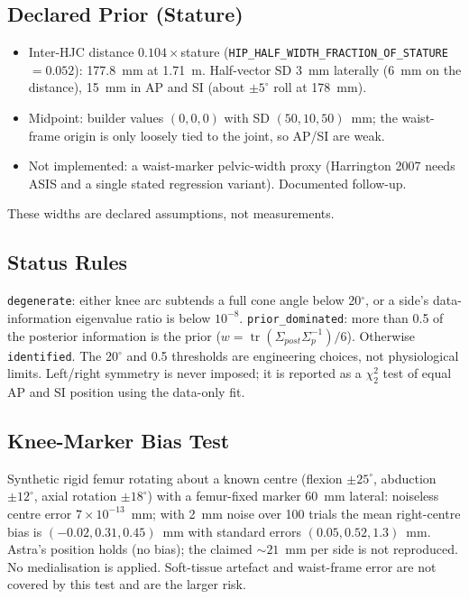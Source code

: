 \subsection{Declared Prior (Stature)}
\begin{itemize}
  \item Inter-HJC distance $0.104\times$stature (\texttt{HIP\_HALF\_WIDTH\_FRACTION\_OF\_STATURE}
  $=0.052$): 177.8~mm at 1.71~m. Half-vector SD 3~mm laterally (6~mm on the distance),
  15~mm in AP and SI (about $\pm5^\circ$ roll at 178~mm).
  \item Midpoint: builder values $(0,0,0)$ with SD $(50,10,50)$~mm; the waist-frame
  origin is only loosely tied to the joint, so AP/SI are weak.
  \item Not implemented: a waist-marker pelvic-width proxy (Harrington 2007 needs ASIS and
  a single stated regression variant). Documented follow-up.
\end{itemize}
These widths are declared assumptions, not measurements.

\subsection{Status Rules}
\texttt{degenerate}: either knee arc subtends a full cone angle below 20$^\circ$, or a
side's data-information eigenvalue ratio is below $10^{-8}$. \texttt{prior\_dominated}:
more than 0.5 of the posterior information is the prior ($w=\operatorname{tr}(\Sigma_{post}\Sigma_p^{-1})/6$).
Otherwise \texttt{identified}. The 20$^\circ$ and 0.5 thresholds are engineering
choices, not physiological limits. Left/right symmetry is never imposed; it is
reported as a $\chi^2_2$ test of equal AP and SI position using the data-only fit.

\subsection{Knee-Marker Bias Test}
Synthetic rigid femur rotating about a known centre (flexion $\pm25^\circ$, abduction
$\pm12^\circ$, axial rotation $\pm18^\circ$) with a femur-fixed marker 60~mm lateral:
noiseless centre error $7\times10^{-13}$~mm; with 2~mm noise over 100 trials the
mean right-centre bias is $(-0.02,0.31,0.45)$~mm with standard errors
$(0.05,0.52,1.3)$~mm. Astra's position holds (no bias); the claimed $\sim21$~mm
per side is not reproduced. No medialisation is applied. Soft-tissue artefact and
waist-frame error are not covered by this test and are the larger risk.

